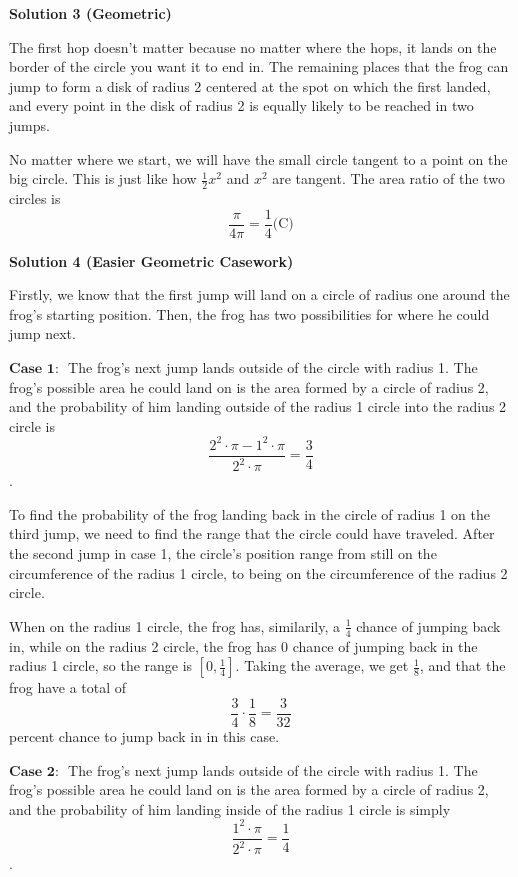 \begin{enumerate}
\textbf{Solution 3 (Geometric)}

The first  hop doesn't matter because no matter where the  hops, it lands on the border of the circle you want it to end in.  The remaining places that the frog can jump to form a disk of radius 2 centered at the spot on which the  first landed, and every point in the disk of radius 2 is equally likely to be reached in two jumps.

 
No matter where we start, we will have the small circle tangent to a point on the big circle. This is just like how $\frac{1}{2}x^2$ and $x^2$ are tangent. The area ratio of the two circles is 
 \[\frac{\pi}{4\pi} = \boxed{\frac{1}{4} \text{(C)}}\]




\textbf{Solution 4 (Easier Geometric Casework)}

Firstly, we know that the first jump will land on a circle of radius one around the frog's starting position. Then, the frog has two possibilities for where he could jump next.

 $\textbf{Case 1: }$ The frog's next jump lands outside of the circle with radius 1. The frog's possible area he could land on is the area formed by a circle of radius 2, and the probability of him landing outside of the radius 1 circle into the radius 2 circle is 
 \[\frac{2^2 \cdot \pi - 1^2 \cdot \pi}{2^2 \cdot \pi} = \frac{3}{4}\].

 To find the probability of the frog landing back in the circle of radius 1 on the third jump, we need to find the range that the circle could have traveled. After the second jump in case 1, the circle's position range from still on the circumference of the radius 1 circle, to being on the circumference of the radius 2 circle.

 When on the radius 1 circle, the frog has, similarily, a $\frac{1}{4}$ chance of jumping back in, while on the radius 2 circle, the frog has 0 chance of jumping back in the radius 1 circle, so the range is $[0, \frac{1}{4}]$. Taking the average, we get $\frac{1}{8}$, and that the frog have a total of 
 \[\frac{3}{4} \cdot \frac{1}{8} = \frac{3}{32}\] percent chance to jump back in in this case.

 $\textbf{Case 2: }$ The frog's next jump lands outside of the circle with radius 1. The frog's possible area he could land on is the area formed by a circle of radius 2, and the probability of him landing inside of the radius 1 circle is simply 
 \[\frac{1^2 \cdot \pi}{2^2 \cdot \pi} = \frac{1}{4}\].


\end{enumerate}
